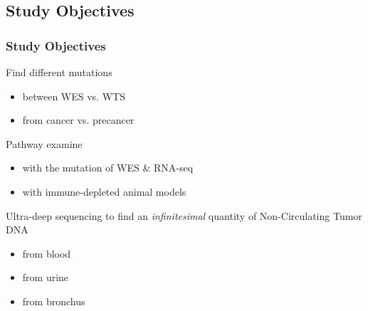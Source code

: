 \documentclass{beamer}
\begin{document}
    \subsection{Study Objectives}
    \begin{frame}
        \frametitle{Study Objectives}

        \begin{block}{Find different mutations}
            \begin{itemize}
                \item between WES vs. WTS
                \item from cancer vs. precancer
            \end{itemize}
        \end{block}

        \begin{block}{Pathway examine}
            \begin{itemize}
                \item with the mutation of WES \& RNA-seq
                \item with immune-depleted animal models
            \end{itemize}
        \end{block}

        \begin{block}{Ultra-deep sequencing}
            to find an \textit{infinitesimal} quantity of Non-Circulating Tumor DNA
            \begin{itemize}
                \item from blood
                \item from urine
                \item from bronchus
            \end{itemize}
        \end{block}
    \end{frame}
\end{document}
